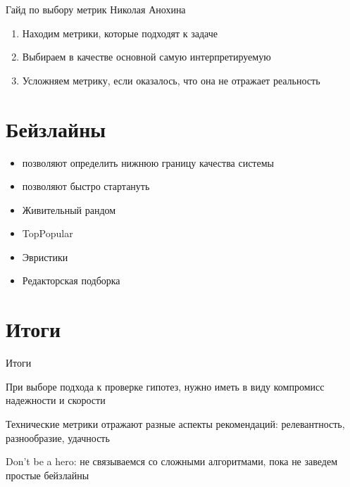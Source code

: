 \documentclass[11pt,aspectratio=169,handout]{beamer}
\begin{document}
\begin{frame}{Гайд по выбору метрик Николая Анохина}

\begin{enumerate}
\item Находим метрики, которые подходят к задаче
\item Выбираем в качестве основной самую интерпретируемую
\item Усложняем метрику, если оказалось, что она не отражает реальность
\end{enumerate}

\end{frame}

\section{Бейзлайны}

\begin{frame}{}

\begin{tcolorbox}[colback=info!5,colframe=info!80,title=Простые бейзлайны]
\begin{itemize}
\item позволяют определить нижнюю границу качества системы
\item позволяют быстро стартануть
\end{itemize}

\end{tcolorbox}

\vfill

\begin{itemize}%
\item Живительный рандом
\item TopPopular
\item Эвристики
\item Редакторская подборка
\end{itemize}

\end{frame}

\section{Итоги}

\begin{frame}{Итоги}

\begin{tcolorbox}[colback=info!5,colframe=info!80,title=]
При выборе подхода к проверке гипотез, нужно иметь в виду компромисс надежности и скорости
\end{tcolorbox}

\begin{tcolorbox}[colback=info!5,colframe=info!80,title=]
Технические метрики отражают разные аспекты рекомендаций: релевантность, разнообразие, удачность
\end{tcolorbox}

\begin{tcolorbox}[colback=info!5,colframe=info!80,title=]
Don't be a hero: не связываемся со сложными алгоритмами, пока не заведем простые бейзлайны
\end{tcolorbox}

\end{frame}
\end{document}
